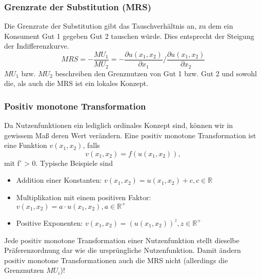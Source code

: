 \subsubsection*{Grenzrate der Substitution (MRS)}

Die Grenzrate der Substitution gibt das Tauschverhältnis an, zu dem ein Konsument Gut 1 gegeben Gut 2 tauschen würde. Dies entsprecht der Steigung der Indifferenzkurve.
	$$ MRS = - \frac{MU_1}{MU_2} = - \frac{\partial u(x_1, x_2)}{\partial x_1} \big/ \frac{\partial u(x_1, x_2)}{\partial x_2} $$ %
$MU_1$ bzw. $MU_2$ beschreiben den Grenznutzen von Gut 1 bzw. Gut 2 und sowohl die, als auch die MRS ist ein lokales Konzept.

\subsubsection*{Positiv monotone Transformation}

Da Nutzenfunktionen ein lediglich ordinales Konzept sind, können wir in gewissem Maß deren Wert verändern. Eine positiv monotone Transformation ist eine Funktion $v(x_1, x_2)$, falls
$$ v(x_1, x_2) = f(u(x_1, x_2)), $$
mit f' > 0. Typische Beispiele sind
\begin{itemize}
	\item Addition einer Konstanten: $v(x_1, x_2) = u(x_1, x_2) + c, c \in \mathbb{R}$
	\item Multiplikation mit einem positiven Faktor: $v(x_1, x_2) = a \cdot u(x_1, x_2), a \in \mathbb{R}^+$
	\item Positive Exponenten: $v(x_1, x_2) = \left(u(x_1, x_2) \right)^{z}, z \in \mathbb{R}^+$
\end{itemize}

Jede positiv monotone Transformation einer Nutzenfunktion stellt dieselbe Präferenzordnung dar wie die ursprüngliche Nutzenfunktion. Damit ändern positiv monotone Transformationen auch die MRS nicht (allerdings die Grenznutzen $MU_i$)!

